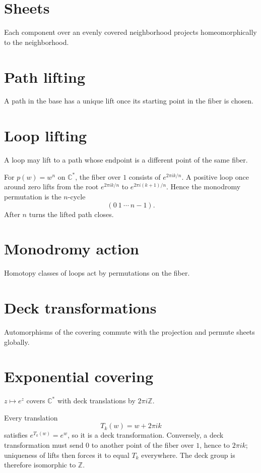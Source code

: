 \section{Sheets}
Each component over an evenly covered neighborhood projects homeomorphically to the neighborhood.

\section{Path lifting}
A path in the base has a unique lift once its starting point in the fiber is chosen.

\section{Loop lifting}
A loop may lift to a path whose endpoint is a different point of the same fiber.

\begin{example}\label{ex:iv23-expand-02}
For \(p(w)=w^n\) on \(\mathbb C^*\), the fiber over \(1\) consists of \(e^{2\pi ik/n}\). A positive loop once around zero lifts from the root \(e^{2\pi ik/n}\) to \(e^{2\pi i(k+1)/n}\). Hence the monodromy permutation is the \(n\)-cycle
\[
(0\ 1\ \cdots\ n-1).
\]
After \(n\) turns the lifted path closes.
\end{example}
\section{Monodromy action}
Homotopy classes of loops act by permutations on the fiber.

\section{Deck transformations}
Automorphisms of the covering commute with the projection and permute sheets globally.

\section{Exponential covering}
$z\mapsto e^z$ covers $\mathbb C^*$ with deck translations by $2\pi i\mathbb Z$.

\begin{example}\label{ex:iv23-expand-03}
Every translation
\[
T_k(w)=w+2\pi i k
\]
satisfies \(e^{T_k(w)}=e^w\), so it is a deck transformation. Conversely, a deck transformation must send \(0\) to another point of the fiber over \(1\), hence to \(2\pi i k\); uniqueness of lifts then forces it to equal \(T_k\) everywhere. The deck group is therefore isomorphic to \(\mathbb Z\).
\end{example}
